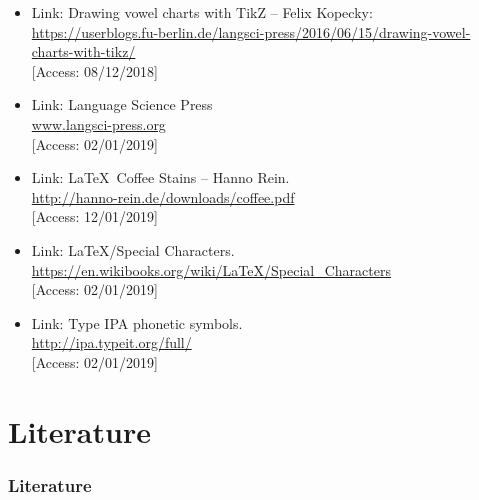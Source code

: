 \documentclass[a4paper,10pt,handout]{beamer}
\begin{document}
\begin{frame}[allowframebreaks]
{\begin{itemize}

		\item Link: Drawing vowel charts with TikZ -- Felix Kopecky:\\
		\url{https://userblogs.fu-berlin.de/langsci-press/2016/06/15/drawing-vowel-charts-with-tikz/}\\
		{[}Access: 08/12/2018]		

		\item Link: Language Science Press\\
		\url{www.langsci-press.org}\\
		{[}Access: 02/01/2019]		
		
		\item Link: \LaTeX\ Coffee Stains -- Hanno Rein.\\
		\url{http://hanno-rein.de/downloads/coffee.pdf}\\
		{[}Access: 12/01/2019]
		
		\item Link: \LaTeX /Special Characters.\\
		\url{https://en.wikibooks.org/wiki/LaTeX/Special_Characters}\\
		{[}Access: 02/01/2019]
		
		\item Link: Type IPA phonetic symbols.\\
		\url{http://ipa.typeit.org/full/}\\
		{[}Access: 02/01/2019]

	\end{itemize}
}

\end{frame}


\section{Literature}

\begin{frame}[allowframebreaks]
\frametitle{Literature}

%	

%	 
	 

{\footnotesize
	
}	
\end{frame}

\backupend
\end{document}
